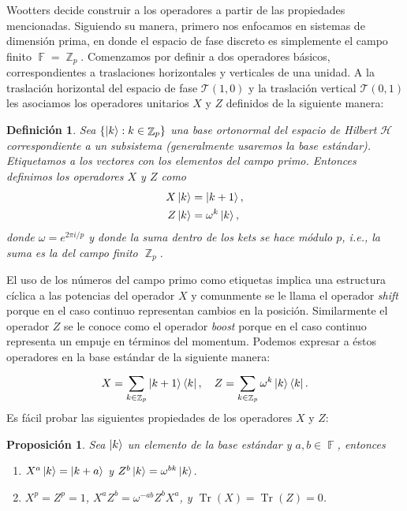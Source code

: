 \documentclass[a4paper]{report}
\DeclareMathOperator{\Z}{\mathbb{Z}}
\DeclareMathOperator{\F}{\mathbb{F}}
\DeclareMathOperator{\Tr}{Tr}
\newtheorem{definition}{Definición}
\newtheorem{proposition}{Proposición}
\begin{document}
  Wootters decide construir a los operadores a partir de las
  propiedades mencionadas. Siguiendo su manera, primero nos
  enfocamos en sistemas de dimensión prima, en donde el
  espacio de fase discreto es simplemente el campo finito
  $\F = \Z_p$. Comenzamos por definir a dos operadores
  básicos, correspondientes a traslaciones horizontales y
  verticales de una unidad. A la traslación horizontal del
  espacio de fase $\mathcal T(1,0)$ y la traslación vertical
  $\mathcal T(0,1)$ les asociamos los operadores unitarios
  $X$ y $Z$ definidos de la siguiente manera:
  \begin{definition}
    Sea $\{\ket k : k \in \Z_p\}$ una base ortonormal del
    espacio de Hilbert $\mathcal H$ correspondiente a un
    subsistema (generalmente usaremos la base estándar).
    Etiquetamos a los vectores con los elementos del campo
    primo. Entonces definimos los operadores $X$ y $Z$ como
    \begin{align}
      X \ket k
      &= \ket{k + 1}, \\
      Z \ket k
      &= \omega^{k} \ket k,
    \end{align}
    donde $\omega = e^{2\pi i / p}$ y donde la suma dentro
    de los kets se hace módulo $p$, i.e., la suma es la del
    campo finito $\Z_p$.
  \end{definition}
  El uso de los números del campo primo como etiquetas
  implica una estructura cíclica a las potencias del
  operador $X$ y comunmente se le llama el operador
  \textit{shift} porque en el caso continuo representan
  cambios en la posición. Similarmente el operador $Z$ se le
  conoce como el operador \textit{boost} porque en el caso
  continuo representa un empuje en términos del momentum.
  Podemos expresar a éstos operadores en la base
  estándar de la siguiente manera:
  \begin{equation}
    X = \sum_{k \in \Z_p}^{} \ket{k+1}\bra{k}, \\
    \quad
    Z = \sum_{k \in \Z_p}^{} \omega^{k} \ket k \bra k.
  \end{equation}
  Es fácil probar las siguientes propiedades de los
  operadores $X$ y $Z$:
  \begin{proposition}
    \label{prop:prime_XZ_props}
    Sea $\ket k$ un elemento de la base estándar y $a,b \in
    \F$, entonces
    \begin{enumerate}
      \item $X^{a} \ket{k} = \ket{k+a}$ y $Z^{b} \ket{k} =
        \omega^{b k} \ket{k}$.
      \item $X^{p} = Z^{p} = 1$, $X^{a} Z^{b} = \omega^{-ab}
        Z^{b} X^{a}$, y $\Tr(X) = \Tr(Z) = 0$.
    \end{enumerate}
  \end{proposition}
   
\end{document}
